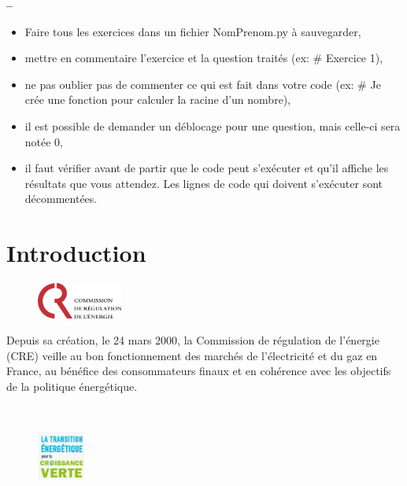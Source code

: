 

\begin{center}
{\Large\bf {\type} \no {\numero} -- \descrip}
\end{center}


\begin{boxedminipage}{.9\textwidth} 
\begin{itemize}
 \item Faire tous les exercices dans un fichier {NomPrenom.py} à sauvegarder,
 \item mettre en commentaire l'exercice et la question traités (ex: \# Exercice 1),
 \item ne pas oublier pas de commenter ce qui est fait dans votre code (ex: \# Je crée une fonction pour calculer la racine d'un nombre),
 \item il est possible de demander un déblocage pour une question, mais celle-ci sera notée 0,
 \item il faut vérifier avant de partir que le code peut s'exécuter et qu'il affiche les résultats que vous attendez. Les lignes de code qui doivent s'exécuter sont décommentées.
\end{itemize}
\end{boxedminipage}

\section{Introduction}

\begin{figure}
\centering
\vspace{-\baselineskip}
    \includegraphics[width=0.25\textwidth]{img/cre}
    \label{fig:img1}
\end{figure}

Depuis sa création, le 24 mars 2000, la Commission de régulation de l'énergie (CRE) veille au bon fonctionnement des marchés de l'électricité et du gaz en France, au bénéfice des consommateurs finaux et en cohérence avec les objectifs de la politique énergétique.

~\

\begin{figure}
\centering
\vspace{-\baselineskip}
    \includegraphics[width=0.14\textwidth]{img/ltecv}
    \label{fig:img2}
\end{figure}

